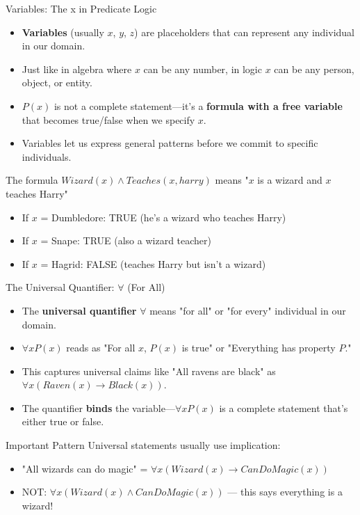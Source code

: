 \documentclass{beamer}
\begin{document}
	\begin{frame}{Variables: The x in Predicate Logic}
		\begin{itemize}
			\item \textbf{Variables} (usually $x$, $y$, $z$) are placeholders that can represent any individual in our domain.
			\item Just like in algebra where $x$ can be any number, in logic $x$ can be any person, object, or entity.
			\item $P(x)$ is not a complete statement—it's a \textbf{formula with a free variable} that becomes true/false when we specify $x$.
			\item Variables let us express general patterns before we commit to specific individuals.
		\end{itemize}
		
		\begin{example}
			The formula $Wizard(x) \wedge Teaches(x, harry)$ means "$x$ is a wizard and $x$ teaches Harry"
			\begin{itemize}
				\item If $x$ = Dumbledore: TRUE (he's a wizard who teaches Harry)
				\item If $x$ = Snape: TRUE (also a wizard teacher)  
				\item If $x$ = Hagrid: FALSE (teaches Harry but isn't a wizard)
			\end{itemize}
		\end{example}
	\end{frame}
	
	\begin{frame}{The Universal Quantifier: $\forall$ (For All)}
		\begin{itemize}
			\item The \textbf{universal quantifier} $\forall$ means "for all" or "for every" individual in our domain.
			\item $\forall x P(x)$ reads as "For all $x$, $P(x)$ is true" or "Everything has property $P$."
			\item This captures universal claims like "All ravens are black" as $\forall x (Raven(x) \rightarrow Black(x))$.
			\item The quantifier \textbf{binds} the variable—$\forall x P(x)$ is a complete statement that's either true or false.
		\end{itemize}
		
		\begin{alertblock}{Important Pattern}
			Universal statements usually use implication:
			\begin{itemize}
				\item "All wizards can do magic" = $\forall x (Wizard(x) \rightarrow CanDoMagic(x))$
				\item NOT: $\forall x (Wizard(x) \wedge CanDoMagic(x))$ — this says everything is a wizard!
			\end{itemize}
		\end{alertblock}
	\end{frame}
	
\end{document}
